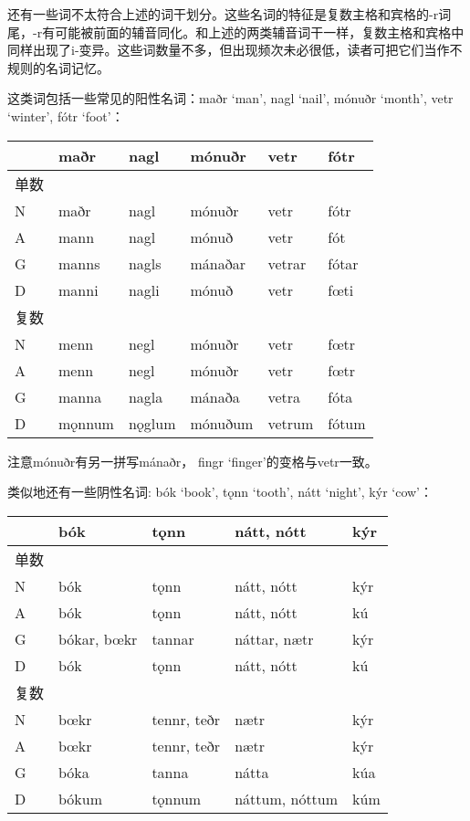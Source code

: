 还有一些词不太符合上述的词干划分。这些名词的特征是复数主格和宾格的-r词尾，-r有可能被前面的辅音同化。和上述的两类辅音词干一样，复数主格和宾格中同样出现了i-变异。这些词数量不多，但出现频次未必很低，读者可把它们当作不规则的名词记忆。

这类词包括一些常见的阳性名词：maðr `man', nagl `nail', mónuðr `month',
vetr `winter', fótr `foot'：

\begin{longtable}{llllll}
  \toprule
       & \textbf{maðr}   & \textbf{nagl}   & \textbf{mónuðr}  & \textbf{vetr}   & \textbf{fótr}  \\
  \midrule
  \endhead
  \bottomrule
  \endfoot
  单数 &        &        &         &        &       \\
  N    & maðr   & nagl   & mónuðr  & vetr   & fótr  \\
  A    & mann   & nagl   & mónuð   & vetr   & fót   \\
  G    & manns  & nagls  & mánaðar & vetrar & fótar \\
  D    & manni  & nagli  & mónuð   & vetr   & fœti  \\
  复数 &        &        &         &        &       \\
  N    & menn   & negl   & mónuðr  & vetr   & fœtr  \\
  A    & menn   & negl   & mónuðr  & vetr   & fœtr  \\
  G    & manna  & nagla  & mánaða  & vetra  & fóta  \\
  D    & mǫnnum & nǫglum & mónuðum & vetrum & fótum \\
\end{longtable}

注意mónuðr有另一拼写mánaðr， fingr `finger‌'的变格与vetr一致。

类似地还有一些阴性名词: bók `book', tǫnn `tooth', nátt `night', kýr
`cow'：

\begin{longtable}{lllll}
  \toprule
       & \textbf{bók}         & \textbf{tǫnn}        & \textbf{nátt, nótt}     & \textbf{kýr} \\
  \midrule
  \endhead
  \bottomrule
  \endfoot
  单数 &             &             &                &     \\
  N    & bók         & tǫnn        & nátt, nótt     & kýr \\
  A    & bók         & tǫnn        & nátt, nótt     & kú  \\
  G    & bókar, bœkr & tannar      & náttar, nætr   & kýr \\
  D    & bók         & tǫnn        & nátt, nótt     & kú  \\
  复数 &             &             &                &     \\
  N    & bœkr        & tennr, teðr & nætr           & kýr \\
  A    & bœkr        & tennr, teðr & nætr           & kýr \\
  G    & bóka        & tanna       & nátta          & kúa \\
  D    & bókum       & tǫnnum      & náttum, nóttum & kúm \\
\end{longtable}

